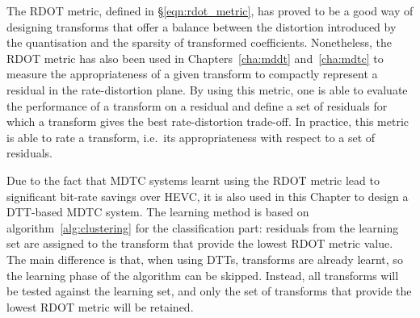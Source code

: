 \documentclass[11pt,a4paper,openright,twoside]{book}
\numberwithin{equation}{section} %
\numberwithin{figure}{section} %
\numberwithin{table}{section} %
\begin{document}
The \ac{RDOT} metric, defined in \S\ref{eqn:rdot_metric}, has proved to be a
good way of designing transforms that offer a balance between the distortion
introduced by the quantisation and the sparsity of transformed coefficients.
Nonetheless, the \ac{RDOT} metric has also been used in
Chapters~\ref{cha:mddt} and~\ref{cha:mdtc} to measure the appropriateness of a
given transform to compactly represent a residual in the rate-distortion
plane.
By using this metric, one is able to evaluate the performance of a transform
on a residual and define a set of residuals for which a transform gives the
best rate-distortion trade-off.
In practice, this metric is able to rate a transform, i.e.\ its
appropriateness with respect to a set of residuals.

Due to the fact that \ac{MDTC} systems learnt using the \acs{RDOT} metric
lead to significant bit-rate savings over \ac{HEVC}, it is also used in this
Chapter to design a \ac{DTT}-based \ac{MDTC} system.
The learning method is based on algorithm~\ref{alg:clustering} for the
classification part:
residuals from the learning set are assigned to the transform that provide the
lowest \acs{RDOT} metric value.
The main difference is that, when using \acp{DTT}, transforms are already
learnt, so the learning phase of the algorithm can be skipped.
Instead, all transforms will be tested against the learning set, and only the
set of transforms that provide the lowest \ac{RDOT} metric will be
retained.
\end{document}
